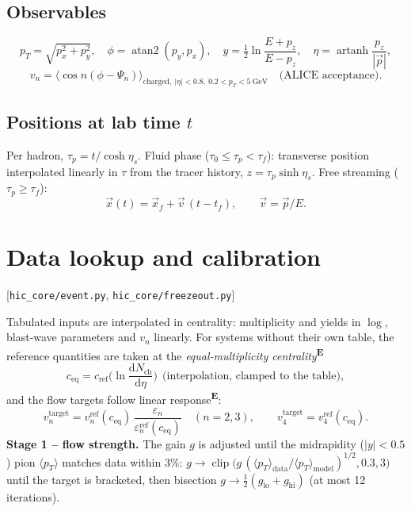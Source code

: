 \documentclass[11pt,a4paper]{article}
\newcommand{\file}[1]{\texttt{\small #1}}
\newcommand{\src}[1]{\hfill{\small\color{gray}[#1]}}
\newcommand{\emp}{\textsuperscript{\color{orange!80!black}\textbf{E}}}
\begin{document}
\subsection{Observables}
\begin{equation}
p_T = \sqrt{p_x^2+p_y^2},\quad \phi = \operatorname{atan2}(p_y,p_x),\quad
y = \tfrac12\ln\frac{E+p_z}{E-p_z},\quad \eta = \operatorname{artanh}\frac{p_z}{|\vec p|},
\end{equation}
\begin{equation}
v_n = \big\langle\cos n(\phi-\Psi_n)\big\rangle_{\text{charged},\ |\eta|<0.8,\ 0.2<p_T<5~\text{GeV}}\quad
\text{(ALICE acceptance)}.
\end{equation}

\subsection{Positions at lab time $t$}
Per hadron, $\tau_p = t/\cosh\eta_s$. Fluid phase ($\tau_0\le\tau_p<\tau_f$): transverse position interpolated linearly in
$\tau$ from the tracer history, $z=\tau_p\sinh\eta_s$. Free streaming ($\tau_p\ge\tau_f$):
\begin{equation}
\vec x(t) = \vec x_f + \vec v\,(t-t_f),\qquad \vec v = \vec p/E .
\end{equation}

\section{Data lookup and calibration}\label{sec:calib}
\src{\file{hic\_core/event.py}, \file{hic\_core/freezeout.py}}

Tabulated inputs are interpolated in centrality: multiplicity and yields in $\log$, blast-wave parameters and $v_n$
linearly. For systems without their own table, the reference quantities are taken at the \emph{equal-multiplicity
centrality}\emp
\begin{equation}
c_\text{eq} = c_\text{ref}\Big(\ln\frac{\mathrm dN_\text{ch}}{\mathrm d\eta}\Big)\ \ \text{(interpolation, clamped to the table)},
\end{equation}
and the flow targets follow linear response\emp:
\begin{equation}
v_n^\text{target} = v_n^\text{ref}(c_\text{eq})\,\frac{\varepsilon_n}{\varepsilon_n^\text{ref}(c_\text{eq})}\quad(n=2,3),\qquad
v_4^\text{target} = v_4^\text{ref}(c_\text{eq}).
\end{equation}
\textbf{Stage 1 -- flow strength.} The gain $g$ is adjusted until the midrapidity ($|y|<0.5$) pion $\langle p_T\rangle$
matches data within 3\%: $g\to\operatorname{clip}\big(g\,(\langle p_T\rangle_\text{data}/\langle p_T\rangle_\text{model})^{1/2},0.3,3\big)$
until the target is bracketed, then bisection $g\to\tfrac12(g_\text{lo}+g_\text{hi})$ (at most 12 iterations).
\end{document}
